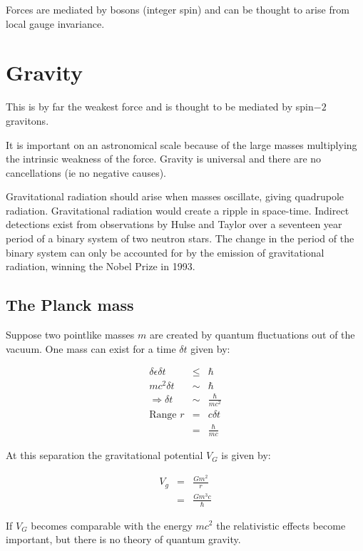 Forces are mediated by bosons (integer spin) and can be thought to arise from local gauge invariance.

\section{Gravity}

This is by far the weakest force and is thought to be mediated by spin$-2$ gravitons.

It is important on an astronomical scale because of the large masses multiplying the intrinsic weakness of the force.  Gravity is universal and there are no cancellations (ie no negative causes).

Gravitational radiation should arise when masses oscillate, giving quadrupole radiation.  Gravitational radiation would create a ripple in space-time.  Indirect detections exist from observations by Hulse and Taylor over a seventeen year period of a binary system of two neutron stars.  The change in the period of the binary system can only be accounted for by the emission of gravitational radiation, winning the Nobel Prize in 1993.

\subsection{The Planck mass}

Suppose two pointlike masses $m$ are created by quantum fluctuations out of the vacuum.  One mass can exist for a time $\delta t$ given by:

\begin{eqnarray*}
  \delta \epsilon \delta t & \le & \hbar \\
  mc^2 \delta t & \sim & \hbar \\
  \Rightarrow \delta t & \sim & \frac{\hbar}{mc^2} \\
  \textrm{Range } r & = & c \delta t \\
  & = & \frac{\hbar}{mc}
\end{eqnarray*}

At this separation the gravitational potential $V_G$ is given by:

\begin{eqnarray*}
  V_g & = & \frac{Gm^2}{r} \\
  & = & \frac{Gm^3c}{\hbar}
\end{eqnarray*}

If $V_G$ becomes comparable with the energy $mc^2$ the relativistic effects become important, but there is no theory of quantum gravity.

